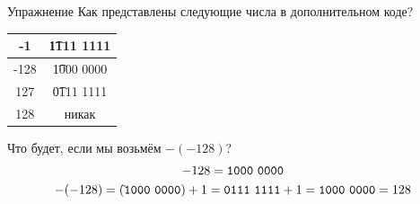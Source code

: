 \begin{frame}{Упражнение}
	Как представлены следующие числа в дополнительном коде?

	\begin{center}
		\pause
		\begin{tabular}{|c|c|}
			\hline
			-1 & \pause \t{1111 1111} \\\hline\noalign{\pause}
			-128 & \pause \t{1000 0000} \\\hline\noalign{\pause}
			127 & \pause \t{0111 1111} \\\hline\noalign{\pause}
			128 & \pause никак \\\hline
		\end{tabular}
		\pause
	\end{center}
	Что будет, если мы возьмём $-(-128)$? \pause
	\begin{gather*}
		-128=\t{1000~0000} \\
		-(-128)=(\tilde{}\t{1000~0000})+1 = \t{0111~1111}+1 = \t{1000~0000} = 128 \\
	\end{gather*}
\end{frame}
